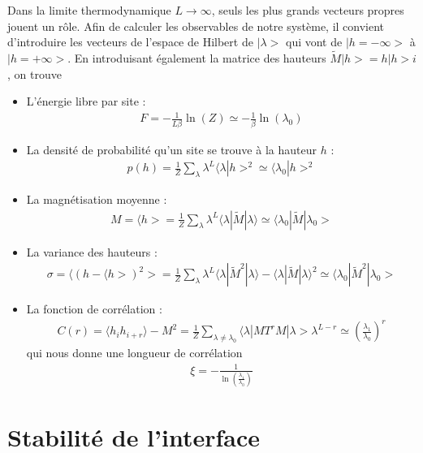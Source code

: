 Dans la limite thermodynamique $L \to \infty$, seuls les plus grands vecteurs propres jouent un rôle. Afin de calculer les observables de notre système, il convient d'introduire les vecteurs de l'espace de Hilbert de ${|\lambda>}$ qui vont de $|h = -\infty>$ à $|h = +\infty>$.
En introduisant également la matrice des hauteurs $\tilde{M} |h> = h |h> i$, on trouve
\begin{itemize}
	\item L'énergie libre par site :  
	\begin{align}
		F =  - \frac{1}{L \beta} \ln(Z) \simeq - \frac{1}{\beta } \ln( \lambda_0)
		\label{energie-libre-site}
	\end{align}
	\item La densité de probabilité qu'un site se trouve à la hauteur $h$ :
	\begin{align}
		p(h) = \frac{1}{Z} \sum_\lambda \lambda^L \langle\lambda | h >^2 \simeq \langle \lambda_0 | h >^2
	\end{align}
	\item La magnétisation moyenne :
	\begin{align}
		M = \langle h > = \frac{1}{Z} \sum_\lambda \lambda^L \langle \lambda | \tilde{M} | \lambda \rangle \simeq \langle \lambda_0 | \tilde{M} | \lambda_0 > 
		\label{tm-magnetisation}
	\end{align}
	\item La variance des hauteurs :
	\begin{align}
		\sigma = \langle (h - \langle h >)^2 > = \frac{1}{Z} \sum_\lambda \lambda^L \langle \lambda | \tilde{M}^2 | \lambda \rangle - \langle \lambda | \tilde{M}| \lambda \rangle^2  \simeq  \langle \lambda_0 | \tilde{M}^2 | \lambda_0 >
	\end{align}
	\item La fonction de corrélation :
	\begin{align}
	    C(r) = \langle h_i h_{i+r} \rangle - M^2 = \frac{1}{Z} \sum_{\lambda \neq \lambda_0} \langle \lambda | M T^r M | \lambda > \lambda^{L-r}  \simeq \left( \frac{\lambda_1}{\lambda_0} \right)^r
	\end{align}
	qui nous donne une longueur de corrélation
	\begin{align}
	    \xi = - \frac{1}{\ln(\frac{\lambda_1}{\lambda_0})}
	\end{align}
\end{itemize}

	\section{Stabilité de l'interface}
	\label{par-stab}


